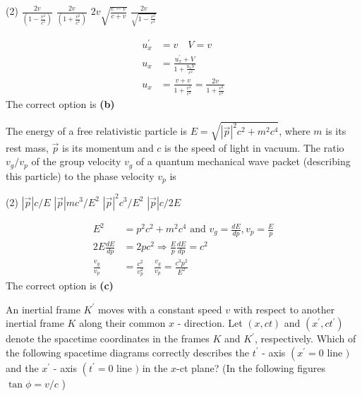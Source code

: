 \begin{enumerate}
\begin{minipage}{\textwidth}
\end{minipage}
\begin{tasks}(2)
	\task[\textbf{A.}] $\frac{2 v}{\left(1-\frac{v^{2}}{c^{2}}\right)}$ 
	\task[\textbf{B.}]$\frac{2 v}{\left(1+\frac{v^{2}}{c^{2}}\right)}$
	\task[\textbf{C.}] $2 v \sqrt{\frac{c-v}{c+v}}$ 
	\task[\textbf{D.}]$\frac{2 v}{\sqrt{1-\frac{v^{2}}{c^{2}}}}$
\end{tasks}
\begin{answer}
	\begin{align*}
	u_{x}^{\prime}&=v \quad V=v\\
	u_{x}&=\frac{u_{x}^{\prime}+V}{1+\frac{u_{x} V}{c^{2}}}\\
	u_{x}&=\frac{v+v}{1+\frac{v^{2}}{c^{2}}}=\frac{2 v}{1+\frac{v^{2}}{c^{2}}}
	\end{align*}
	The correct option is \textbf{(b)}
\end{answer}
\begin{minipage}{\textwidth}
	\item The energy of a free relativistic particle is $E=\sqrt{|\vec{p}|^{2} c^{2}+m^{2} c^{4}}$, where $m$ is its rest mass, $\vec{p}$ is its momentum and $c$ is the speed of light in vacuum. The ratio $v_{g} / v_{p}$ of the group velocity $v_{g}$ of a quantum mechanical wave packet (describing this particle) to the phase velocity $v_{p}$ is
\end{minipage}
\begin{tasks}(2)
	\task[\textbf{A.}] $|\vec{p}| c / E$
	\task[\textbf{B.}]$|\vec{p}| m c^{3} / E^{2}$
	\task[\textbf{C.}] $|\vec{p}|^{2} c^{3} / E^{2}$
	\task[\textbf{D.}]$|\vec{p}| c / 2 E$
\end{tasks}
	\begin{answer}
		\begin{align*}
		E^{2}&=p^{2} c^{2}+m^{2} c^{4} \text { and } v_{g}=\frac{d E}{d p}, v_{p}=\frac{E}{p}\\
		2 E \frac{d E}{d p}&=2 p c^{2} \Rightarrow \frac{E}{p} \frac{d E}{d p}=c^{2}\\
		\frac{v_{g}}{v_{p}}&=\frac{c^{2}}{v_{p}^{2}} \quad \frac{v_{g}}{v_{p}}=\frac{c^{3} p^{2}}{E^{2}}
		\end{align*}
		The correct option is \textbf{(c)}
\end{answer}
\begin{minipage}{\textwidth}
	\item An inertial frame $K^{\prime}$ moves with a constant speed $v$ with respect to another inertial frame $K$ along their common $x$ - direction. Let $(x, c t)$ and $\left(x^{\prime}, c t^{\prime}\right)$ denote the spacetime coordinates in the frames $K$ and $K^{\prime}$, respectively. Which of the following spacetime diagrams correctly describes the $t^{\prime}$ - axis $\left(x^{\prime}=0\right.$ line $)$ and the $x^{\prime}$ - axis $\left(t^{\prime}=0\right.$ line $)$ in the $x$-ct plane? (In the following figures $\tan \phi=v / c$ )

\end{minipage}
\end{enumerate}
